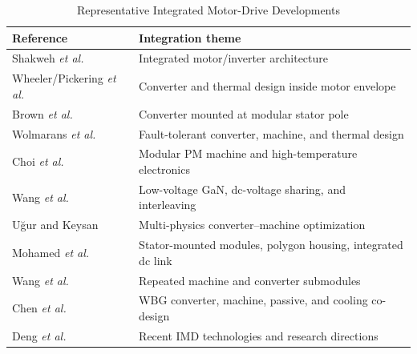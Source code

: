 \begin{table}[!t]
\centering
\caption{Representative Integrated Motor-Drive
Developments}
\label{tab:immd_relevance}
\footnotesize
\renewcommand{\arraystretch}{1.05}
\setlength{\tabcolsep}{3pt}
\begin{tabular}{@{}>{\raggedright\arraybackslash}p{}>{\raggedright\arraybackslash}p{}@{}}
\hline
\textbf{Reference} & \textbf{Integration theme}\\
\hline

Shakweh \textit{et al.} \cite{Shakweh2002PlugPlayIMD} &
Integrated motor/inverter architecture\\

Wheeler/Pickering \textit{et al.}
\cite{Wheeler2005Integrated30kW,Pickering2006ThermalIMD} &
Converter and thermal design inside motor envelope\\

Brown \textit{et al.} \cite{Brown2007IMMD} &
Converter mounted at modular stator pole\\

Wolmarans \textit{et al.} \cite{Wolmarans2008IntegratedFT} &
Fault-tolerant converter, machine, and thermal design\\

Choi \textit{et al.} \cite{Choi2011IMMD} &
Modular PM machine and high-temperature electronics\\

Wang \textit{et al.}
\cite{Wang2013GaNIMMD,Wang2015GaNIMMD} &
Low-voltage GaN, dc-voltage sharing, and interleaving\\

U\u{g}ur and Keysan
\cite{Ugur2018GaNIMMD,Ugur2019MultiphysicsIMMD} &
Multi-physics converter--machine optimization\\

Mohamed \textit{et al.}
\cite{Mohamed2021Electrothermal,Mohamed2021EnhancedIMD,Mohamed2022IntegratedDCLink} &
Stator-mounted modules, polygon housing, integrated dc link\\

Wang \textit{et al.} \cite{Wang2025GaNIMMD} &
Repeated machine and converter submodules\\

Chen \textit{et al.} \cite{Chen2026WBGIMD} &
WBG converter, machine, passive, and cooling co-design\\

Deng \textit{et al.} \cite{Deng2026IMDReview} &
Recent IMD technologies and research directions\\
\hline
\end{tabular}
\end{table}

